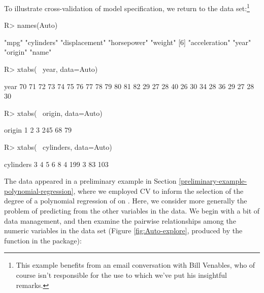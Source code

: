 \documentclass[
]{jss}
\begin{document}
To illustrate cross-validation of model specification, we return to the
 data set:\footnote{This example benefits from an email
  conversation with Bill Venables, who of course isn't responsible for
  the use to which we've put his insightful remarks.}

\begin{CodeChunk}
\begin{CodeInput}
R> names(Auto)
\end{CodeInput}
\begin{CodeOutput}
[1] "mpg"          "cylinders"    "displacement" "horsepower"   "weight"      
[6] "acceleration" "year"         "origin"       "name"        
\end{CodeOutput}
\begin{CodeInput}
R> xtabs(~ year, data=Auto)
\end{CodeInput}
\begin{CodeOutput}
year
70 71 72 73 74 75 76 77 78 79 80 81 82 
29 27 28 40 26 30 34 28 36 29 27 28 30 
\end{CodeOutput}
\begin{CodeInput}
R> xtabs(~ origin, data=Auto)
\end{CodeInput}
\begin{CodeOutput}
origin
  1   2   3 
245  68  79 
\end{CodeOutput}
\begin{CodeInput}
R> xtabs(~ cylinders, data=Auto)
\end{CodeInput}
\begin{CodeOutput}
cylinders
  3   4   5   6   8 
  4 199   3  83 103 
\end{CodeOutput}
\end{CodeChunk}

The  data appeared in a preliminary example in Section
\ref{preliminary-example-polynomial-regression}, where we employed CV to
inform the selection of the degree of a polynomial regression of
 on . Here, we consider more generally the
problem of predicting  from the other variables in the
 data. We begin with a bit of data management, and then
examine the pairwise relationships among the numeric variables in the
data set (Figure \ref{fig:Auto-explore}, produced by the
 function in the  package):
\end{document}
